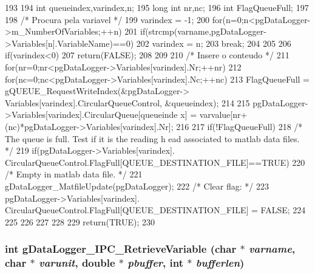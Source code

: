\begin{DoxyCode}
193 {
194         int queueindex,varindex,n;
195         long int nr,nc;
196         int FlagQueueFull;
197         
198         /* Procura pela variavel */
199         varindex = -1;
200         for(n=0;n<pgDataLogger->m_NumberOfVariables;++n){
201                 if(strcmp(varname,pgDataLogger->Variables[n].VariableName)==0){
202                         varindex = n;
203                         break;
204                 }
205         }
206         if(varindex<0){
207                 return(FALSE);
208         }
209 
210         /* Insere o conteudo */
211         for(nr=0;nr<pgDataLogger->Variables[varindex].Nr;++nr){
212                 for(nc=0;nc<pgDataLogger->Variables[varindex].Nc;++nc){
213                         FlagQueueFull = gQUEUE_RequestWriteIndex(&pgDataLogger->
      Variables[varindex].CircularQueueControl, &queueindex);
214 
215                         pgDataLogger->Variables[varindex].CircularQueue[queueinde
      x] = varvalue[nr+(nc)*pgDataLogger->Variables[varindex].Nr];
216 
217                         if(!FlagQueueFull){
218                                 /* The queue is full. Test if it is the reading h
      ead associated to matlab data files. */
219                                 if(pgDataLogger->Variables[varindex].
      CircularQueueControl.FlagFull[QUEUE_DESTINATION_FILE]==TRUE){
220                                         /* Empty in matlab data file. */
221                                         gDataLogger_MatfileUpdate(pgDataLogger);
222                                         /* Clear flag: */
223                                         pgDataLogger->Variables[varindex].
      CircularQueueControl.FlagFull[QUEUE_DESTINATION_FILE] = FALSE;
224                                 }
225                         }
226                 }
227         }
228 
229         return(TRUE);
230 }
\end{DoxyCode}
\subsubsection[{gDataLogger\_\-IPC\_\-RetrieveVariable}]{\setlength{\rightskip}{0pt plus 5cm}int gDataLogger\_\-IPC\_\-RetrieveVariable (char $\ast$ {\em varname}, \/  char $\ast$ {\em varunit}, \/  double $\ast$ {\em pbuffer}, \/  int $\ast$ {\em bufferlen})}\label{gdatalogger_8h_a555a2628f1bfa33692e5f51961d287a5}



